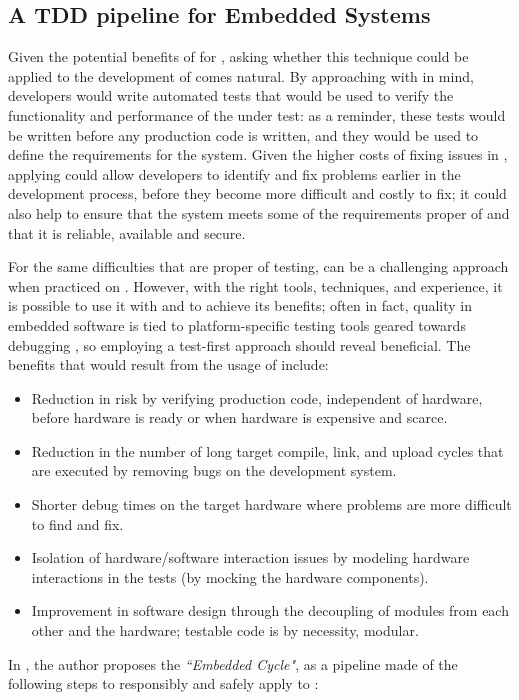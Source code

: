 \subsection{A TDD pipeline for Embedded Systems}
Given the potential benefits of \tdd for \noess, asking whether this technique could be applied to the development of \ess comes natural. By approaching \es with \tdd in mind, developers would write automated tests that would be used to verify the functionality and performance of the \es under test: as a reminder, these tests would be written before any production code is written, and they would be used to define the requirements for the system. 
Given the higher costs of fixing issues in \ess, applying \tdd could allow developers to identify and fix problems earlier in the development process, before they become more difficult and costly to fix; it could also help to ensure that the system meets some of the requirements proper of \ess and that it is reliable, available and secure.

For the same difficulties that are proper of \es testing, \tdd can be a challenging approach when practiced on \ess. However, with the right tools, techniques, and experience, it is possible to use it with and to achieve its benefits; often in fact, quality in embedded software is tied to platform-specific testing tools geared towards debugging \cite{TDDEmbeddedSoftware}, so employing a test-first approach should reveal beneficial.
The benefits that would result from the usage of \tdd include:
\begin{itemize}
    \item Reduction in risk by verifying production code, independent of hardware, before hardware is ready or when hardware is expensive and scarce.
    \item Reduction in the number of long target compile, link, and upload cycles that are executed by removing bugs on the development system.
    \item Shorter debug times on the target hardware where problems are more difficult to find and fix.
    \item Isolation of hardware/software interaction issues by modeling hardware interactions in the tests (\eg by mocking the hardware components).
    \item Improvement in software design through the decoupling of modules from each other and the hardware; testable code is by necessity, modular.
\end{itemize}


\noindent In \cite{TDDEC}, the author proposes the \textit{``Embedded \tdd Cycle"}, as a pipeline made of the following steps to responsibly and safely apply \tdd to \ess:

